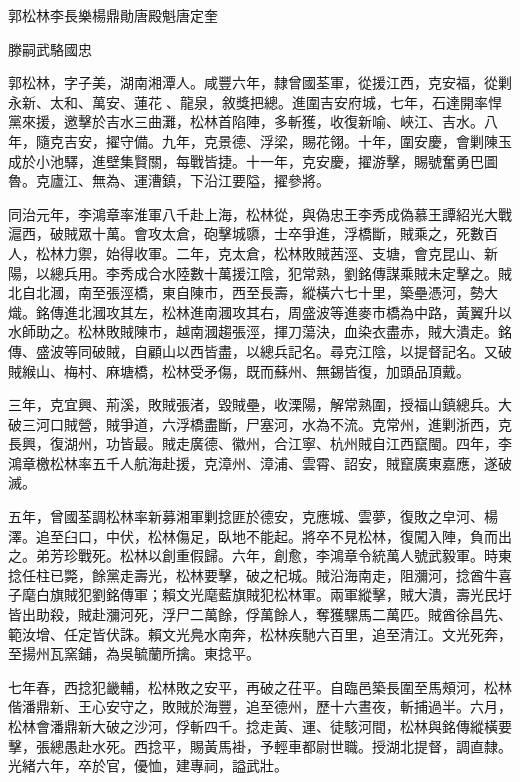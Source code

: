 
\begin{pinyinscope}
郭松林李長樂楊鼎勛唐殿魁唐定奎

滕嗣武駱國忠

郭松林，字子美，湖南湘潭人。咸豐六年，隸曾國荃軍，從援江西，克安福，從剿永新、太和、萬安、蓮花、龍泉，敘獎把總。進圍吉安府城，七年，石達開率悍黨來援，邀擊於吉水三曲灘，松林首陷陣，多斬獲，收復新喻、峽江、吉水。八年，隨克吉安，擢守備。九年，克景德、浮梁，賜花翎。十年，圍安慶，會剿陳玉成於小池驛，進壁集賢關，每戰皆捷。十一年，克安慶，擢游擊，賜號奮勇巴圖魯。克廬江、無為、運漕鎮，下沿江要隘，擢參將。

同治元年，李鴻章率淮軍八千赴上海，松林從，與偽忠王李秀成偽慕王譚紹光大戰滬西，破賊眾十萬。會攻太倉，砲擊城隳，士卒爭進，浮橋斷，賊乘之，死數百人，松林力禦，始得收軍。二年，克太倉，松林敗賊茜涇、支塘，會克昆山、新陽，以總兵用。李秀成合水陸數十萬援江陰，犯常熟，劉銘傳謀乘賊未定擊之。賊北自北漍，南至張涇橋，東自陳市，西至長壽，縱橫六七十里，築壘憑河，勢大熾。銘傳進北漍攻其左，松林進南漍攻其右，周盛波等進麥市橋為中路，黃翼升以水師助之。松林敗賊陳市，越南漍趨張涇，揮刀蕩決，血染衣盡赤，賊大潰走。銘傳、盛波等同破賊，自顧山以西皆盡，以總兵記名。尋克江陰，以提督記名。又破賊緱山、梅村、麻塘橋，松林受矛傷，既而蘇州、無錫皆復，加頭品頂戴。

三年，克宜興、荊溪，敗賊張渚，毀賊壘，收溧陽，解常熟圍，授福山鎮總兵。大破三河口賊營，賊爭道，六浮橋盡斷，尸塞河，水為不流。克常州，進剿浙西，克長興，復湖州，功皆最。賊走廣德、徽州，合江寧、杭州賊自江西竄閩。四年，李鴻章檄松林率五千人航海赴援，克漳州、漳浦、雲霄、詔安，賊竄廣東嘉應，遂破滅。

五年，曾國荃調松林率新募湘軍剿捻匪於德安，克應城、雲夢，復敗之皁河、楊澤。追至臼口，中伏，松林傷足，臥地不能起。將卒不見松林，復闖入陣，負而出之。弟芳珍戰死。松林以創重假歸。六年，創愈，李鴻章令統萬人號武毅軍。時東捻任柱已斃，餘黨走壽光，松林要擊，破之杞城。賊沿海南走，阻瀰河，捻酋牛喜子麾白旗賊犯劉銘傳軍；賴文光麾藍旗賊犯松林軍。兩軍縱擊，賊大潰，壽光民圩皆出助殺，賊赴瀰河死，浮尸二萬餘，俘萬餘人，奪獲騾馬二萬匹。賊酋徐昌先、範汝增、任定皆伏誅。賴文光鳧水南奔，松林疾馳六百里，追至清江。文光死奔，至揚州瓦窯鋪，為吳毓蘭所擒。東捻平。

七年春，西捻犯畿輔，松林敗之安平，再破之茌平。自臨邑築長圍至馬頰河，松林偕潘鼎新、王心安守之，敗賊於海豐，追至德州，歷十六晝夜，斬捕過半。六月，松林會潘鼎新大破之沙河，俘斬四千。捻走黃、運、徒駭河間，松林與銘傳縱橫要擊，張總愚赴水死。西捻平，賜黃馬褂，予輕車都尉世職。授湖北提督，調直隸。光緒六年，卒於官，優恤，建專祠，謚武壯。


\end{pinyinscope}
